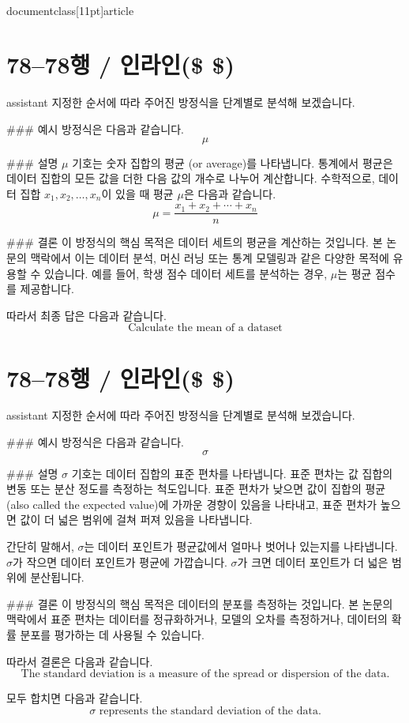 \\documentclass[11pt]{article}
\begin{document}
\section*{78–78행 / 인라인(\$ \$) }
assistant
지정한 순서에 따라 주어진 방정식을 단계별로 분석해 보겠습니다.

### 예시
방정식은 다음과 같습니다.
\[
\mu
\]

### 설명
\(\mu\) 기호는 숫자 집합의 평균 (or average)를 나타냅니다. 통계에서 평균은 데이터 집합의 모든 값을 더한 다음 값의 개수로 나누어 계산합니다. 수학적으로, 데이터 집합 \(x_1, x_2, \ldots, x_n\)이 있을 때 평균 \(\mu\)은 다음과 같습니다.
\[
\mu = \frac{x_1 + x_2 + \cdots + x_n}{n}
\]

### 결론
이 방정식의 핵심 목적은 데이터 세트의 평균을 계산하는 것입니다. 본 논문의 맥락에서 이는 데이터 분석, 머신 러닝 또는 통계 모델링과 같은 다양한 목적에 유용할 수 있습니다. 예를 들어, 학생 점수 데이터 세트를 분석하는 경우, \(\mu\)는 평균 점수를 제공합니다.

따라서 최종 답은 다음과 같습니다.
\[
\boxed{\text{Calculate the mean of a dataset}}
\]

\section*{78–78행 / 인라인(\$ \$) }
assistant
지정한 순서에 따라 주어진 방정식을 단계별로 분석해 보겠습니다.

### 예시
방정식은 다음과 같습니다.
\[
\sigma
\]

### 설명
\(\sigma\) 기호는 데이터 집합의 표준 편차를 나타냅니다. 표준 편차는 값 집합의 변동 또는 분산 정도를 측정하는 척도입니다. 표준 편차가 낮으면 값이 집합의 평균 (also called the expected value)에 가까운 경향이 있음을 나타내고, 표준 편차가 높으면 값이 더 넓은 범위에 걸쳐 퍼져 있음을 나타냅니다.

간단히 말해서, \(\sigma\)는 데이터 포인트가 평균값에서 얼마나 벗어나 있는지를 나타냅니다. \(\sigma\)가 작으면 데이터 포인트가 평균에 가깝습니다. \(\sigma\)가 크면 데이터 포인트가 더 넓은 범위에 분산됩니다.

### 결론
이 방정식의 핵심 목적은 데이터의 분포를 측정하는 것입니다. 본 논문의 맥락에서 표준 편차는 데이터를 정규화하거나, 모델의 오차를 측정하거나, 데이터의 확률 분포를 평가하는 데 사용될 수 있습니다.

따라서 결론은 다음과 같습니다.
\[
\text{The standard deviation is a measure of the spread or dispersion of the data.}
\]

모두 합치면 다음과 같습니다.
\[
\boxed{\sigma \text{ represents the standard deviation of the data.}}
\]
\end{document}
